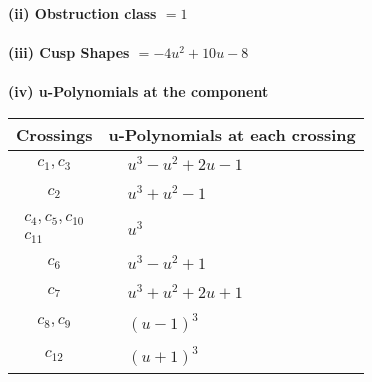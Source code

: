\documentclass[1p]{elsarticle_modified}
\theoremstyle{definition}
\begin{document}
\flushleft \textbf{(ii) Obstruction class $= 1$}\\~\\
\flushleft \textbf{(iii) Cusp Shapes $= -4 u^2+10 u-8$}\\~\\
\newpage\renewcommand{\arraystretch}{1}
\flushleft \textbf{(iv) u-Polynomials at the component}\newline \\
\begin{tabular}{m{50pt}|m{274pt}}
Crossings & \hspace{64pt}u-Polynomials at each crossing \\
\hline $$\begin{aligned}c_{1},c_{3}\end{aligned}$$&$\begin{aligned}
&u^3- u^2+2 u-1
\end{aligned}$\\
\hline $$\begin{aligned}c_{2}\end{aligned}$$&$\begin{aligned}
&u^3+u^2-1
\end{aligned}$\\
\hline $$\begin{aligned}c_{4},c_{5},c_{10}\\c_{11}\end{aligned}$$&$\begin{aligned}
&u^3
\end{aligned}$\\
\hline $$\begin{aligned}c_{6}\end{aligned}$$&$\begin{aligned}
&u^3- u^2+1
\end{aligned}$\\
\hline $$\begin{aligned}c_{7}\end{aligned}$$&$\begin{aligned}
&u^3+u^2+2 u+1
\end{aligned}$\\
\hline $$\begin{aligned}c_{8},c_{9}\end{aligned}$$&$\begin{aligned}
&(u-1)^3
\end{aligned}$\\
\hline $$\begin{aligned}c_{12}\end{aligned}$$&$\begin{aligned}
&(u+1)^3
\end{aligned}$\\
\hline
\end{tabular}\\~\\
\end{document}
